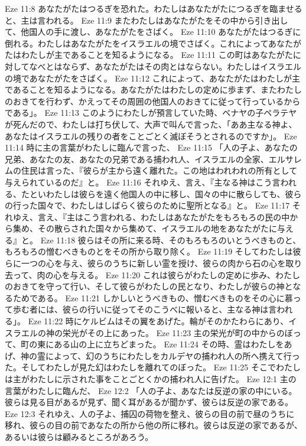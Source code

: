 Eze 11:8  あなたがたはつるぎを恐れた。わたしはあなたがたにつるぎを臨ませると、主は言われる。
Eze 11:9  またわたしはあなたがたをその中から引き出して、他国人の手に渡し、あなたがたをさばく。
Eze 11:10  あなたがたはつるぎに倒れる。わたしはあなたがたをイスラエルの境でさばく。これによってあなたがたはわたしが主であることを知るようになる。
Eze 11:11  この町はあなたがたに対してなべとはならず、あなたがたはその肉とはならない。わたしはイスラエルの境であなたがたをさばく。
Eze 11:12  これによって、あなたがたはわたしが主であることを知るようになる。あなたがたはわたしの定めに歩まず、またわたしのおきてを行わず、かえってその周囲の他国人のおきてに従って行っているからである」。
Eze 11:13  このようにわたしが預言していた時、ベナヤの子ペラテヤが死んだので、わたしは打ち伏して、大声で叫んで言った、「ああ主なる神よ、あなたはイスラエルの残りの者をことごとく滅ぼそうとされるのですか」。
Eze 11:14  時に主の言葉がわたしに臨んで言った、
Eze 11:15  「人の子よ、あなたの兄弟、あなたの友、あなたの兄弟である捕われ人、イスラエルの全家、エルサレムの住民は言った、『彼らが主から遠く離れた。この地はわれわれの所有として与えられているのだ』と。
Eze 11:16  それゆえ、言え、『主なる神はこう言われる、たといわたしは彼らを遠く他国人の中に移し、国々の中に散らしても、彼らの行った国々で、わたしはしばらく彼らのために聖所となる』と。
Eze 11:17  それゆえ、言え、『主はこう言われる、わたしはあなたがたをもろもろの民の中から集め、その散らされた国々から集めて、イスラエルの地をあなたがたに与える』と。
Eze 11:18  彼らはその所に来る時、そのもろもろのいとうべきものと、もろもろの憎むべきものとをその所から取り除く。
Eze 11:19  そしてわたしは彼らに一つの心を与え、彼らのうちに新しい霊を授け、彼らの肉から石の心を取り去って、肉の心を与える。
Eze 11:20  これは彼らがわたしの定めに歩み、わたしのおきてを守って行い、そして彼らがわたしの民となり、わたしが彼らの神となるためである。
Eze 11:21  しかしいとうべきもの、憎むべきものをその心に慕って歩む者には、彼らの行いに従ってそのこうべに報いると、主なる神は言われる」。
Eze 11:22  時にケルビムはその翼をあげた。輪がそのかたわらにあり、イスラエルの神の栄光がその上にあった。
Eze 11:23  主の栄光が町の中からのぼって、町の東にある山の上に立ちどまった。
Eze 11:24  その時、霊はわたしをあげ、神の霊によって、幻のうちにわたしをカルデヤの捕われ人の所へ携えて行った。そしてわたしが見た幻はわたしを離れてのぼった。
Eze 11:25  そこでわたしは主がわたしに示された事をことごとくかの捕われ人に告げた。
Eze 12:1  主の言葉がわたしに臨んだ、
Eze 12:2  「人の子よ、あなたは反逆の家の中にいる。彼らは見る目があるが見ず、聞く耳があるが聞かず、彼らは反逆の家である。
Eze 12:3  それゆえ、人の子よ、捕囚の荷物を整え、彼らの目の前で昼のうちに移れ、彼らの目の前であなたの所から他の所に移れ。彼らは反逆の家であるが、あるいは彼らは顧みるところがあろう。
